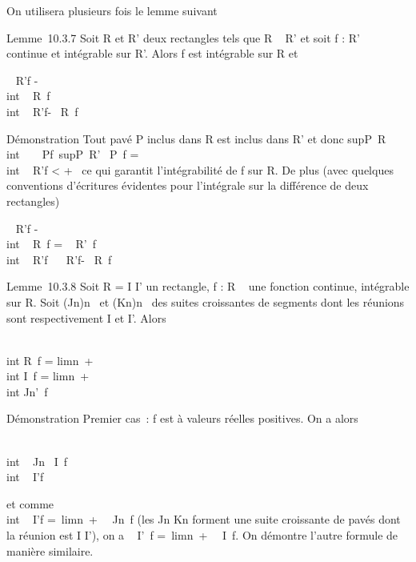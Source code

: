 On utilisera plusieurs fois le lemme suivant

Lemme~10.3.7 Soit R et R' deux rectangles tels que R \subset~ R' et soit f : R'
\rightarrow~  continue et intégrable sur R'. Alors f est intégrable sur R et

\left \textbar{}\int ~
\int  R'f -\\int ~
\int  R~f\right
\textbar{}\leq\int  \\int ~
R'\textbar{}f\textbar{}-\int ~
\int  R~\textbar{}f\textbar{}

Démonstration Tout pavé P inclus dans R est inclus dans R' et donc
supP\subset~R\\int ~
\int ~
P\textbar{}f\textbar{}\leq\
supP\subset~R'\int ~
\int  P~\textbar{}f\textbar{}
=\int  \\int ~
R'\textbar{}f\textbar{} \textless{} +\infty~ ce qui garantit
l'intégrabilité de f sur R. De plus (avec quelques conventions
d'écritures évidentes pour l'intégrale sur la différence de deux
rectangles)

\left \textbar{}\int ~
\int  R'f -\\int ~
\int  R~f\right
\textbar{} = \left \textbar{}\int ~
\int  R'\diagdownR~f\right
\textbar{}\leq\int  \\int ~
R'\diagdownR\textbar{}f\textbar{}\leq\int ~
\int ~
R'\textbar{}f\textbar{}-\int ~
\int  R~\textbar{}f\textbar{}

Lemme~10.3.8 Soit R = I \times I' un rectangle, f : R \rightarrow~  une fonction
continue, intégrable sur R. Soit (Jn)n\in{}~ et
(Kn)n\in\mathbb{N}~ des suites croissantes de segments dont les
réunions sont respectivement I et I'. Alors

\int  \\int  R~f
= limn\rightarrow~+\infty~~\\int
 \int  I\timesKn~f
= limn\rightarrow~+\infty~~\\int
 \int  Jn\timesI'~f

Démonstration Premier cas~: f est à valeurs réelles positives. On a
alors

\int  \\int ~
Jn\timesKnf \leq\int ~
\int  I\timesKn~f
\leq\int  \\int ~
I\timesI'f

et comme \int  \\int ~
I\timesI'f =\
limn\rightarrow~+\infty~\int ~
\int  Jn\timesKn~f (les
Jn  forment une suite croissante de pavés dont
la réunion est I \times I'), on a \int ~
\int  I\timesI'~f =\
limn\rightarrow~+\infty~\int ~
\int  I\timesKn~f. On démontre
l'autre formule de manière similaire.

